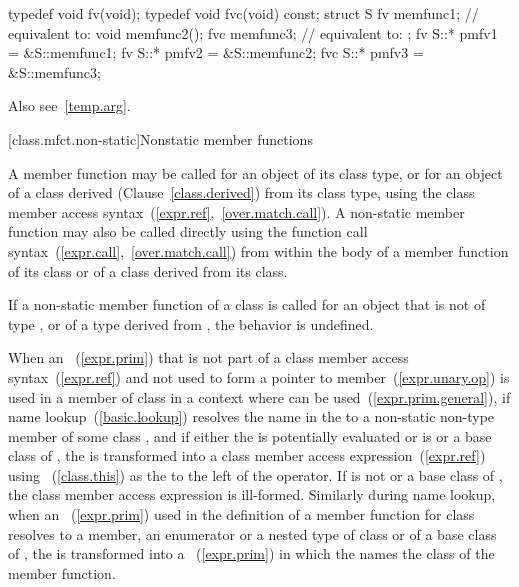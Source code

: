 \begin{codeblock}
typedef void fv(void);
typedef void fvc(void) const;
struct S {
  fv memfunc1;      // equivalent to: 
  void memfunc2();
  fvc memfunc3;     // equivalent to: 
};
fv  S::* pmfv1 = &S::memfunc1;
fv  S::* pmfv2 = &S::memfunc2;
fvc S::* pmfv3 = &S::memfunc3;
\end{codeblock}

Also see~\ref{temp.arg}.
\exitnote

[class.mfct.non-static]{Nonstatic member functions}%

\pnum
A  member function may be called for an object of
its class type, or for an object of a class derived
(Clause~\ref{class.derived}) from its class type, using the class member
access syntax~(\ref{expr.ref},~\ref{over.match.call}). A non-static
member function may also be called directly using the function call
syntax~(\ref{expr.call},~\ref{over.match.call}) from within
the body of a member function of its class or of a class derived from
its class.

\pnum
{}%
If a non-static member function of a class  is called for an
object that is not of type , or of a type derived from
, the behavior is undefined.

\pnum
When an ~(\ref{expr.prim}) that is not part of a
class member access syntax~(\ref{expr.ref}) and not used to form a
pointer to member~(\ref{expr.unary.op}) is used in
a member of class  in a context where  can be
used~(\ref{expr.prim.general}),
if name
lookup~(\ref{basic.lookup}) resolves the name in the
 to a non-static non-type member of some class
,
and if either the  is potentially evaluated or
 is  or a base class of ,
the  is transformed into a class
member access expression~(\ref{expr.ref}) using
~(\ref{class.this}) as the 
to the left of the  operator.
\enternote
If  is not  or a base class of , the class
member access expression is ill-formed.
\exitnote
Similarly during name lookup, when an
~(\ref{expr.prim}) used in the definition of a
member function for class  resolves to a  member,
an enumerator or a nested type of class  or of a base class of
, the  is transformed into a
~(\ref{expr.prim}) in which the
 names the class of the member function.
%
\enterexample

